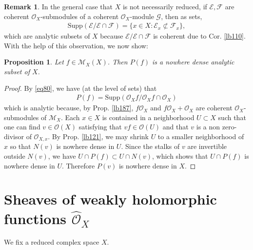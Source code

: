 \documentclass[12pt,b5paper,notitlepage]{report}
\theoremstyle{definition}
\newtheorem{rem}[df]{Remark}
\theoremstyle{plain}
\newtheorem{pp}[df]{Proposition}
\newcommand{\scr}{\mathscr}
\newcommand{\Supp}{\mathrm{Supp}}
\newcommand{\Owht}{\widehat{\scr O}}
\numberwithin{equation}{section}
\begin{document}
\begin{rem}
In the general case that $X$ is not necessarily reduced, if $\scr E,\scr F$ are coherent $\scr O_X$-submodules of a coherent $\scr O_X$-module $\scr G$, then as sets,
\begin{align}
\Supp(\scr E/\scr E\cap\scr F)=\{x\in X:\scr E_x\nsubset\scr F_x\},\label{eq80}
\end{align}
which are analytic subsets of $X$ because $\scr E/\scr E\cap\scr F$ is coherent due to Cor. \ref{lb110}. With the help of this observation, we now show:
\end{rem}


\begin{pp}
Let $f\in\scr M_X(X)$. Then $P(f)$ is a nowhere dense analytic subset of $X$.
\end{pp}



\begin{proof}
By \eqref{eq80}, we have (at the level of sets) that
\begin{align}
P(f)=\Supp(\scr O_Xf/\scr O_Xf\cap\scr O_X)   \label{eq94}
\end{align}
which is analytic because, by Prop. \ref{lb187}, $f\scr O_X$ and $f\scr O_X+\scr O_X$ are coherent $\scr O_X$-submodules of $\scr M_X$. Each $x\in X$ is contained in a neighborhood $U\subset X$ such that one can find $v\in\scr O(X)$ satisfying that $vf\in\scr O(U)$ and that $v$ is a non zero-divisor of $\scr O_{X,x}$. By Prop. \ref{lb121}, we may shrink $U$ to a smaller neighborhood of $x$ so that $N(v)$ is nowhere dense in $U$. Since the stalks of $v$ are invertible outside $N(v)$, we have  $U\cap P(f)\subset U\cap N(v)$, which shows that $U\cap P(f)$ is nowhere dense in $U$. Therefore $P(v)$ is nowhere dense in $X$.
\end{proof}









\section{Sheaves of weakly holomorphic functions $\Owht_X$}


We fix a reduced complex space $X$.
\end{document}
